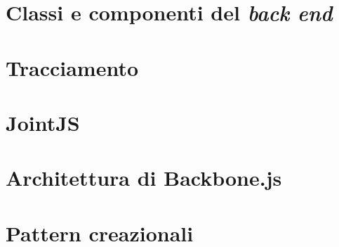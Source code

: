 \section{Classi e componenti del \emph{back end}}


% 

\section{Tracciamento}




\appendix

\section{JointJS} \label{sec:app_jointjs}


\section{Architettura di Backbone.js}


\section{Pattern creazionali} \label{sec:app_creaz}




